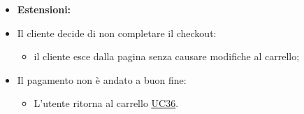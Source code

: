 \begin{itemize}
    \item \textbf{Estensioni:}
    \item Il cliente decide di non completare il checkout:
          \begin{itemize}
              \item  il cliente esce dalla pagina senza causare modifiche al carrello;
          \end{itemize}
    \item Il pagamento non è andato a buon fine:
          \begin{itemize}
              \item L'utente ritorna al carrello \hyperref[sec:UC36]{\underline{UC36}}.
          \end{itemize}
\end{itemize}

